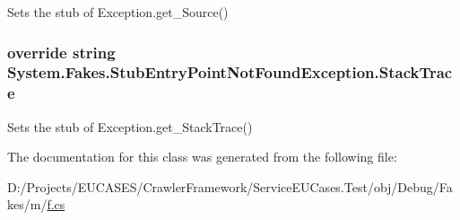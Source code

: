 Sets the stub of Exception.\-get\-\_\-\-Source()

\hypertarget{class_system_1_1_fakes_1_1_stub_entry_point_not_found_exception_a6774c12fbebee65d0c03e08334dd79b4}{
\subsubsection[{Stack\-Trace}]{\setlength{\rightskip}{0pt plus 5cm}override string System.\-Fakes.\-Stub\-Entry\-Point\-Not\-Found\-Exception.\-Stack\-Trace\hspace{0.3cm}{\ttfamily [get]}}}\label{class_system_1_1_fakes_1_1_stub_entry_point_not_found_exception_a6774c12fbebee65d0c03e08334dd79b4}


Sets the stub of Exception.\-get\-\_\-\-Stack\-Trace()



The documentation for this class was generated from the following file\-:\begin{DoxyCompactItemize}
\item 
D\-:/\-Projects/\-E\-U\-C\-A\-S\-E\-S/\-Crawler\-Framework/\-Service\-E\-U\-Cases.\-Test/obj/\-Debug/\-Fakes/m/\hyperlink{m_2f_8cs}{f.\-cs}\end{DoxyCompactItemize}
